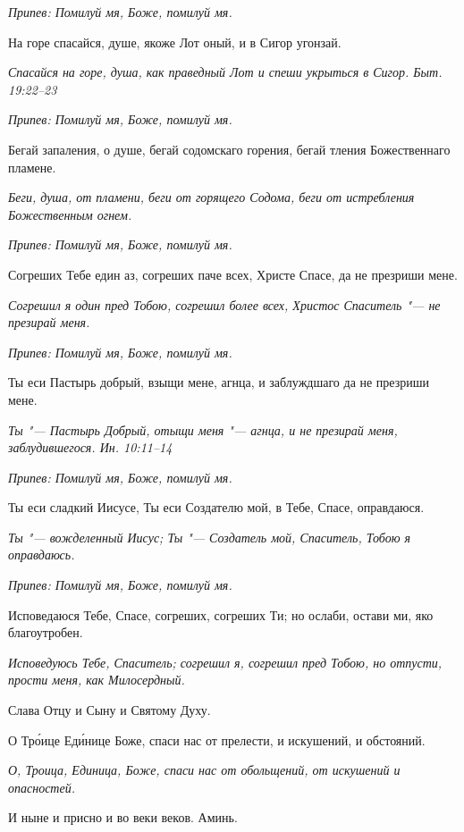 \itshape Припев:\normalfont{} Помилуй мя, Боже, помилуй мя.


На горе спасайся, душе, якоже Лот оный, и в Сигор угонзай.


\itshape Спасайся на горе, душа, как праведный Лот и спеши укрыться в Сигор. Быт. 19:22–23\normalfont{}


\itshape Припев:\normalfont{} Помилуй мя, Боже, помилуй мя.


Бегай запаления, о душе, бегай содомскаго горения, бегай тления Божественнаго пламене.


\itshape Беги, душа, от пламени, беги от горящего Содома, беги от истребления Божественным огнем.\normalfont{}


\itshape Припев:\normalfont{} Помилуй мя, Боже, помилуй мя.


Согреших Тебе един аз, согреших паче всех, Христе Спасе, да не презриши мене.


\itshape Согрешил я один пред Тобою, согрешил более всех, Христос Спаситель "--- не презирай меня.\normalfont{}


\itshape Припев:\normalfont{} Помилуй мя, Боже, помилуй мя.


Ты еси Пастырь добрый, взыщи мене, агнца, и заблуждшаго да не презриши мене.


\itshape Ты "--- Пастырь Добрый, отыщи меня "--- агнца, и не презирай меня, заблудившегося. Ин. 10:11–14\normalfont{}


\itshape Припев:\normalfont{} Помилуй мя, Боже, помилуй мя.


Ты еси сладкий Иисусе, Ты еси Создателю мой, в Тебе, Спасе, оправдаюся.


\itshape Ты "--- вожделенный Иисус; Ты "--- Создатель мой, Спаситель, Тобою я оправдаюсь.\normalfont{}


\itshape Припев:\normalfont{} Помилуй мя, Боже, помилуй мя.


Исповедаюся Тебе, Спасе, согреших, согреших Ти; но ослаби, остави ми, яко благоутробен.


\itshape Исповедуюсь Тебе, Спаситель; согрешил я, согрешил пред Тобою, но отпусти, прости меня, как Милосердный.\normalfont{}


Слава Отцу и Сыну и Святому Духу.


О Тро́ице Еди́нице Боже, спаси нас от прелести, и искушений, и обстояний.


\itshape О, Троица, Единица, Боже, спаси нас от обольщений, от искушений и опасностей.\normalfont{}


И ныне и присно и во веки веков. Аминь.


